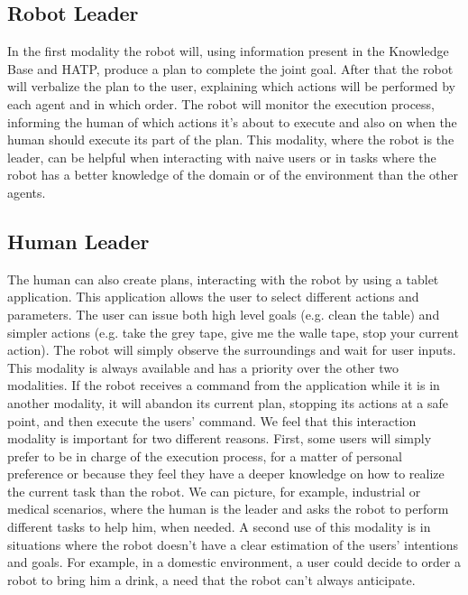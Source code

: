\subsection{Robot Leader}
In the first modality the robot will, using information present in the
Knowledge Base and HATP, produce a plan to complete the joint
goal. After that the robot will verbalize the plan to the user,
explaining which actions will be performed by each agent and in which
order. The robot will monitor the execution process, informing the
human of which actions it's about to execute and also on when the human
should execute its part of the plan. This modality, where the robot is
the leader, can be helpful when interacting with
naive users or in tasks where the robot has a better knowledge of the
domain or of the environment than the other agents.

\subsection{Human Leader}
The human can also create plans, interacting with the robot by using a
tablet application. This application allows the user to select
different actions and parameters. The user can issue both high level goals (e.g. clean the
table) and simpler actions (e.g. take the grey tape, give me the walle
tape, stop your current action). The robot will simply observe the
surroundings and wait for user inputs. This modality is always available and has a priority over
the other two modalities. If the robot receives a command from the
application while it is in another modality, it will abandon its current
plan, stopping its actions at a safe point, and then execute the users'
command. We feel that this interaction modality is important for two
different reasons.  First, some users will simply prefer to be in
charge of the execution process, for a matter of personal preference or because they
feel they have a deeper knowledge on how to realize the current task
than the robot. We can picture, for example, industrial or medical
scenarios, where the human is the leader and asks the robot to perform
different tasks to help him, when needed. A second use of this modality is in situations where
the robot doesn't have  a clear estimation of the users' intentions and
goals. For example, in a domestic environment, a user could decide to
order a robot to bring him a drink, a need that the robot can't always anticipate.

